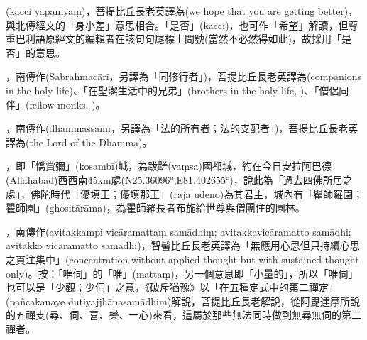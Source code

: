 \startitemgroup[noteitems]
\item{}(kacci yāpanīyaṃ)，菩提比丘長老英譯為(we hope that you are getting better)，與北傳經文的「身小差」意思相合。「是否」(kacci)，也可作「希望」解讀，但尊重巴利語原經文的編輯者在該句句尾標上問號(當然不必然得如此)，故採用「是否」的意思。
\stopitemgroup

\startitemgroup[noteitems]
\item{}，南傳作(Sabrahmacārī，另譯為「同修行者」)，菩提比丘長老英譯為(companions in the holy life)、「在聖潔生活中的兄弟」(brothers in the holy life, )、「僧侶同伴」(fellow monks, )。
\stopitemgroup

\startitemgroup[noteitems]
\item{}，南傳作(dhammassāmī，另譯為「法的所有者；法的支配者」)，菩提比丘長老英譯為(the Lord of the Dhamma)。
\stopitemgroup

\startitemgroup[noteitems]
\item{}，即「憍賞彌」(kosambī)城，為跋蹉(vaṃsa)國都城，約在今日安拉阿巴德(Allahabad)西西南45km處(N25.36096°,E81.402655°)，說此為「過去四佛所居之處」，佛陀時代「優填王；優填那王」(rājā udeno)為其君主，城內有「瞿師羅園；瞿師園」(ghositārāma)，為瞿師羅長者布施給世尊與僧團住的園林。
\stopitemgroup

\startitemgroup[noteitems]
\item{}，南傳作(avitakkampi vicāramattaṃ samādhiṃ; avitakkavicāramatto samādhi; avitakko vicāramatto samādhi)，智髻比丘長老英譯為「無應用心思但只持續心思之貫注集中」(concentration without applied thought but with sustained thought only)。按：「唯伺」的「唯」(mattaṃ)，另一個意思即「小量的」，所以「唯伺」也可以是「少觀；少伺」之意，《破斥猶豫》以「在五種定式中的第二禪定」(pañcakanaye dutiyajjhānasamādhiṃ)解說，菩提比丘長老解說，從阿毘達摩所說的五禪支(尋、伺、喜、樂、一心)來看，這屬於那些無法同時做到無尋無伺的第二禪者。
\stopitemgroup

